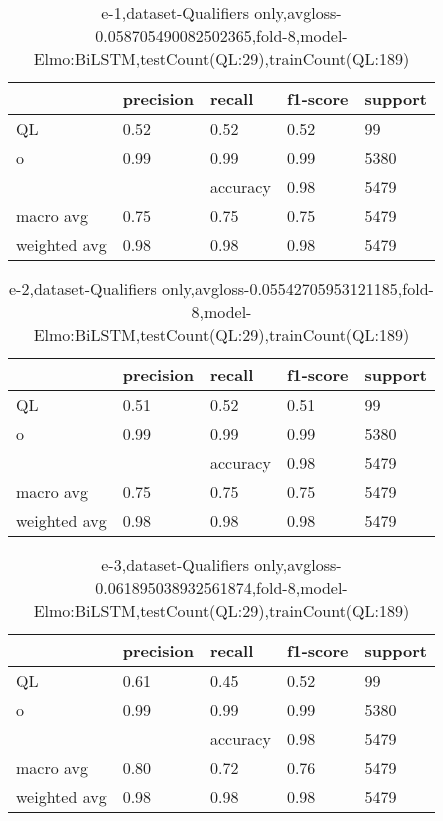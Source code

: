 \begin{table}[!ht] 
\centering
\caption{e-1,dataset-Qualifiers only,avgloss-0.058705490082502365,fold-8,model-Elmo:BiLSTM,testCount(QL:29),trainCount(QL:189)}\label{e-1data-qualS.tsv}
\begin{tabularx}{300pt}{|X|X|X|X|X|}
\hline
&precision&recall&f1-score&support\\
\hline
QL&0.52&0.52&0.52&99\\
\hline
o&0.99&0.99&0.99&5380\\
\hline
&&accuracy&0.98&5479\\
\hline
macro avg&0.75&0.75&0.75&5479\\
\hline
weighted avg&0.98&0.98&0.98&5479\\
\hline
\end{tabularx}
\end{table}
\begin{table}[!ht] 
\centering
\caption{e-2,dataset-Qualifiers only,avgloss-0.05542705953121185,fold-8,model-Elmo:BiLSTM,testCount(QL:29),trainCount(QL:189)}\label{e-2data-qualS.tsv}
\begin{tabularx}{300pt}{|X|X|X|X|X|}
\hline
&precision&recall&f1-score&support\\
\hline
QL&0.51&0.52&0.51&99\\
\hline
o&0.99&0.99&0.99&5380\\
\hline
&&accuracy&0.98&5479\\
\hline
macro avg&0.75&0.75&0.75&5479\\
\hline
weighted avg&0.98&0.98&0.98&5479\\
\hline
\end{tabularx}
\end{table}
\begin{table}[!ht] 
\centering
\caption{e-3,dataset-Qualifiers only,avgloss-0.061895038932561874,fold-8,model-Elmo:BiLSTM,testCount(QL:29),trainCount(QL:189)}\label{e-3data-qualS.tsv}
\begin{tabularx}{300pt}{|X|X|X|X|X|}
\hline
&precision&recall&f1-score&support\\
\hline
QL&0.61&0.45&0.52&99\\
\hline
o&0.99&0.99&0.99&5380\\
\hline
&&accuracy&0.98&5479\\
\hline
macro avg&0.80&0.72&0.76&5479\\
\hline
weighted avg&0.98&0.98&0.98&5479\\
\hline
\end{tabularx}
\end{table}
